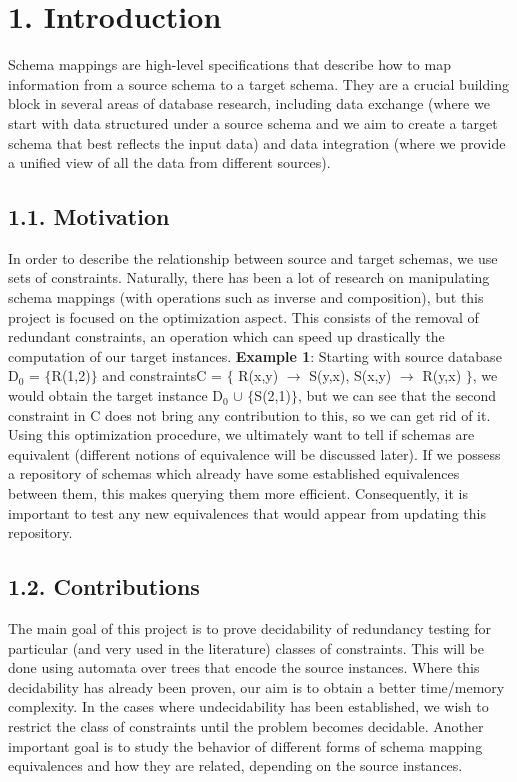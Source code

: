 \documentclass[11pt, a4paper, dvipsnames]{article}
\begin{document}
\newpage

\setcounter{secnumdepth}{-1}
\setcounter{tocdepth}{2}
\tableofcontents

\newpage

\section{1. Introduction}
Schema mappings are high-level specifications that describe how to map information from a source schema to a target schema. They are a crucial building block in several areas of database research, including data exchange\cite{dataexchange} (where we start with data structured under a source schema and we aim to create a target schema that best reflects the input data) and data integration\cite{dataintegration} (where we provide a unified view of all the data from different sources).

\subsection{1.1. Motivation}
In order to describe the relationship between source and target schemas, we use sets of constraints. Naturally, there has been a lot of research on manipulating schema mappings (with operations such as inverse and composition), but this project is focused on the optimization aspect. This consists of the removal of redundant constraints, an operation which can speed up drastically the computation of our target instances. \newline
\textbf{Example 1}: Starting with source database D$_{0}$ = $\{$R(1,2)$\}$ and constraints\newline C = $\{$ R(x,y) $\rightarrow$ S(y,x), S(x,y) $\rightarrow$ R(y,x) $\}$, we would obtain the target instance D$_{0}$ $\cup$ $\{$S(2,1)$\}$, but we can see that the second constraint in C does not bring any contribution to this, so we can get rid of it.\newline
Using this optimization procedure, we ultimately want to tell if schemas are equivalent (different notions of equivalence will be discussed later). If we possess a repository of schemas which already have some established equivalences between them, this makes querying them more efficient. Consequently, it is important to test any new equivalences that would appear from updating this repository. 

\subsection{1.2. Contributions}
The main goal of this project is to prove decidability of redundancy testing for particular (and very used in the literature) classes of constraints. This will be done using automata over trees that encode the source instances. Where this decidability has already been proven, our aim is to obtain a better time/memory complexity. In the cases where undecidability has been established, we wish to restrict the class of constraints until the problem becomes decidable. Another important goal is to study the behavior of different forms of schema mapping equivalences and how they are related, depending on the source instances.
\end{document}
